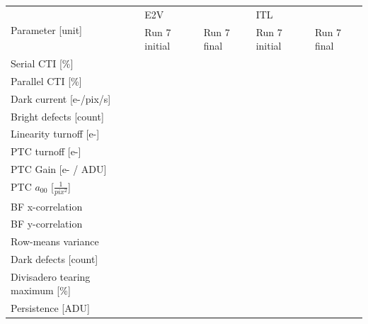 \begin{table}[H]
\begin{tabular}{|l|ll|ll|}
\hline
\multirow{2}{*}{Parameter [unit]}          & \multicolumn{2}{l|}{E2V}                   & \multicolumn{2}{l|}{ITL}                    \\ \cline{2-5} 
                                    & \multicolumn{1}{l|}{Run 7 initial}     & Run 7 final     & \multicolumn{1}{l|}{Run 7 initial}     & Run 7 final      \\ \hline
Serial CTI {[}\%{]}                 & \multicolumn{1}{l|}{} &  & \multicolumn{1}{l|}{} &  \\ \hline
Parallel CTI {[}\%{]}               & \multicolumn{1}{l|}{} &  & \multicolumn{1}{l|}{} &  \\ \hline
Dark current {[}e-/pix/s{]}         & \multicolumn{1}{l|}{}          &           & \multicolumn{1}{l|}{}          &            \\ \hline
Bright defects {[}count{]}          & \multicolumn{1}{l|}{}          &           & \multicolumn{1}{l|}{}          &            \\ \hline
Linearity turnoff {[}e-{]}          & \multicolumn{1}{l|}{} &  & \multicolumn{1}{l|}{} &   \\ \hline
PTC turnoff {[}e-{]}                & \multicolumn{1}{l|}{}  &   & \multicolumn{1}{l|}{}  &    \\ \hline
PTC Gain {[}e- / ADU{]}             & \multicolumn{1}{l|}{}    &    & \multicolumn{1}{l|}{}    &      \\ \hline
PTC $a_{00}$ [$\frac{1}{pix^2}$]      & \multicolumn{1}{l|}{} &  & \multicolumn{1}{l|}{} &   \\ \hline
BF x-correlation                    & \multicolumn{1}{l|}{}    &  & \multicolumn{1}{l|}{}    &      \\ \hline
BF y-correlation                    & \multicolumn{1}{l|}{}    &  & \multicolumn{1}{l|}{}    &      \\ \hline
Row-means variance                  & \multicolumn{1}{l|}{}    &  & \multicolumn{1}{l|}{}    &      \\ \hline
Dark defects {[}count{]}            & \multicolumn{1}{l|}{}          &           & \multicolumn{1}{l|}{}          &            \\ \hline
Divisadero tearing maximum {[}\%{]} & \multicolumn{1}{l|}{}          &           & \multicolumn{1}{l|}{}          &            \\ \hline
Persistence {[}ADU{]}               & \multicolumn{1}{l|}{}          &           & \multicolumn{1}{l|}{}          &            \\ \hline
\end{tabular}
\end{table}


